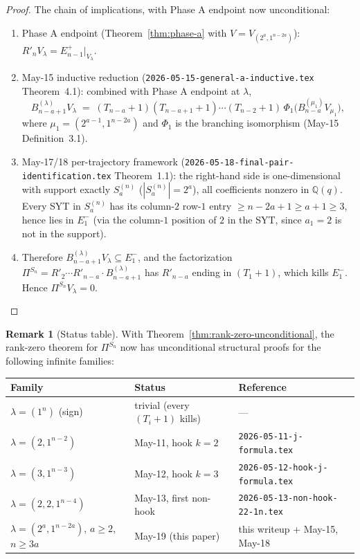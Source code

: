 \documentclass[11pt]{article}
\theoremstyle{definition}
\newtheorem{remark}[theorem]{Remark}
\begin{document}
\begin{proof}
The chain of implications, with Phase A endpoint now unconditional:
\begin{enumerate}[leftmargin=2em,topsep=0.3em,itemsep=0.2em]
\item Phase A endpoint
(Theorem~\ref{thm:phase-a} with $V = V_{(2^a, 1^{n-2a})}$):
$R'_n V_\lambda = E_{n-1}^+|_{V_\lambda}$.
\item May-15 inductive reduction
(\texttt{2026-05-15-general-a-inductive.tex} Theorem~4.1): combined
with Phase A endpoint at $\lambda$,
\[
   B_{n-a+1}^{(\lambda)} V_\lambda
   \;=\;
   (T_{n-a}+1)(T_{n-a+1}+1)\cdots(T_{n-2}+1)\,
   \Phi_1\big(B_{n-a}^{(\mu_1)} V_{\mu_1}\big),
\]
where $\mu_1 = (2^{a-1}, 1^{n-2a})$ and $\Phi_1$ is the branching
isomorphism (May-15 Definition~3.1).
\item May-17/18 per-trajectory framework
(\texttt{2026-05-18-final-pair-identification.tex} Theorem~1.1):
the right-hand side is one-dimensional with support exactly
$S_a^{(n)}$ ($|S_a^{(n)}| = 2^a$), all coefficients nonzero in
$\mathbb{Q}(q)$.  Every SYT in $S_a^{(n)}$ has its column-$2$ row-$1$
entry $\ge n - 2a + 1 \ge a + 1 \ge 3$, hence lies in $E_1^-$
(via the column-$1$ position of $2$ in the SYT, since $a_1 = 2$ is
not in the support).
\item Therefore $B_{n-a+1}^{(\lambda)} V_\lambda \subseteq E_1^-$,
and the factorization $\Pi^{S_n} = R'_2 \cdots R'_{n-a} \cdot
B_{n-a+1}^{(\lambda)}$ has $R'_{n-a}$ ending in $(T_1 + 1)$, which
kills $E_1^-$.  Hence $\Pi^{S_n} V_\lambda = 0$.
\end{enumerate}
\end{proof}

\begin{remark}[Status table]
With Theorem~\ref{thm:rank-zero-unconditional}, the rank-zero
theorem for $\Pi^{S_n}$ now has unconditional structural proofs
for the following infinite families:
\begin{center}
\begin{tabular}{lll}
\toprule
Family & Status & Reference \\
\midrule
$\lambda = (1^n)$ (sign) & trivial (every $(T_i+1)$ kills) & --- \\
$\lambda = (2, 1^{n-2})$ & May-11, hook $k=2$ & \texttt{2026-05-11-j-formula.tex} \\
$\lambda = (3, 1^{n-3})$ & May-12, hook $k=3$ & \texttt{2026-05-12-hook-j-formula.tex} \\
$\lambda = (2, 2, 1^{n-4})$ & May-13, first non-hook & \texttt{2026-05-13-non-hook-22-1n.tex} \\
$\lambda = (2^a, 1^{n-2a})$, $a \ge 2$, $n \ge 3a$ & May-19 (this paper) & this writeup + May-15, May-18 \\
\bottomrule
\end{tabular}
\end{center}
\end{remark}
\end{document}
